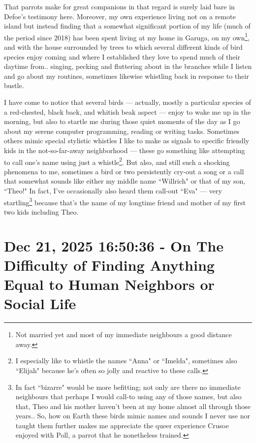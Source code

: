 \documentclass[a4paper]{article}
\begin{document}
That parrots make for great companions in that regard is surely laid bare in Defoe's testimony here. Moreover, my own experience living not on a remote island but instead finding that a somewhat significant portion of my life (much of the period since 2018) has been spent living at my home in Garuga, on my own\footnote{Not married yet and most of my immediate neighbours a good distance away.}, and with the house surrounded by trees to which several different kinds of bird species enjoy coming and where I established they love to spend much of their daytime from.. singing, pecking and fluttering about in the branches while I listen and go about my routines, sometimes likewise whistling back in response to their bustle.


I have come to notice that several birds --- actually, mostly a particular species of a red-chested, black back, and whitish beak aspect --- enjoy to wake me up in the morning, but also to startle me during those quiet moments of the day as I go about my serene computer programming, reading or writing tasks. Sometimes others mimic special stylistic whistles I like to make as signals to specific friendly kids in the not-so-far-away neighborhood --- these go something like attempting to call one's name using just a whistle\footnote{I especially like to whistle the names ``Anna" or ``Imelda", sometimes also ``Elijah" because he's often so jolly and reactive to these calls.}. But also, and still such a shocking phenomena to me, sometimes a bird or two persistently cry-out a song or a call that somewhat sounds like either my middle name ``Willrich" or that of my son, ``Theo!" In fact, I've occasionally also heard them call-out ``Eva" --- very startling\footnote{In fact ``bizarre" would be more befitting; not only are there no immediate neighbours that perhaps I would call-to using any of those names, but also that, Theo and his mother haven't been at my home almost all through those years.. So, how on Earth these birds mimic names and sounds I never use nor taught them further makes me appreciate the queer experience Crusoe enjoyed with Poll, a parrot that he nonetheless trained.} because that's the name of my longtime friend and mother of my first two kids including Theo.





\section{Dec 21, 2025 16:50:36 - On The Difficulty of Finding Anything Equal to Human Neighbors or Social Life}
\label{SEC34}
\end{document}
